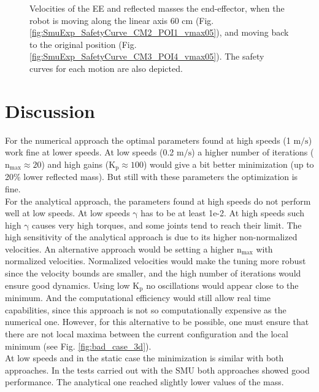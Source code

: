 \begin{figure}[htp!]
	\centering	
	 	 	
	\caption{Velocities of the EE and reflected masses the end-effector, when the robot is moving along the linear axis 60 cm (Fig. \ref{fig:SmuExp_SafetyCurve_CM2_POI1_vmax05}), and moving back to the original position (Fig. \ref{fig:SmuExp_SafetyCurve_CM3_POI4_vmax05}). The safety curves for each motion are also depicted.}  
	\label{fig:SmuExp_SafetyCurve_vmax05}
\end{figure}


\section{Discussion}



For the numerical approach the optimal parameters found at high speeds (1 $\mathrm{m/s}$) work fine at lower speeds. At low speeds (0.2 $\mathrm{m/s}$) a higher number of iterations ($\mathrm{n_{max} \approx 20}$) and high gains ($\mathrm{K_p \approx 100}$) would give a bit better minimization (up to 20\% lower reflected mass). But still with these parameters the optimization is fine. \\
%
 For the analytical approach, the parameters found at high speeds do not perform well at low speeds. At low speeds  $\mathrm{\gamma}$ has to be at least 1e-2. At high speeds such high $\mathrm{\gamma}$ causes very high torques, and some joints tend to reach their limit. The high sensitivity of the analytical approach is due to its higher non-normalized velocities. An alternative approach would be setting a higher $\mathrm{n_{max}}$ with normalized velocities. Normalized velocities would make the tuning more robust since the velocity bounds are smaller, and the high number of iterations would ensure good dynamics. Using low $\mathrm{K_p}$  no oscillations would appear close to the minimum. And the computational efficiency would still allow real time capabilities, since this approach is not so computationally expensive as the numerical one.   
 However, for this alternative to be possible, one must ensure that there are not local maxima between the current configuration and the local minimum (see Fig. \ref{fig:bad_case_3d}).\\
%
At low speeds and in the static case the minimization is similar with both approaches. In the tests carried out with the SMU both approaches showed good performance. The analytical one reached slightly lower values of the mass. 


